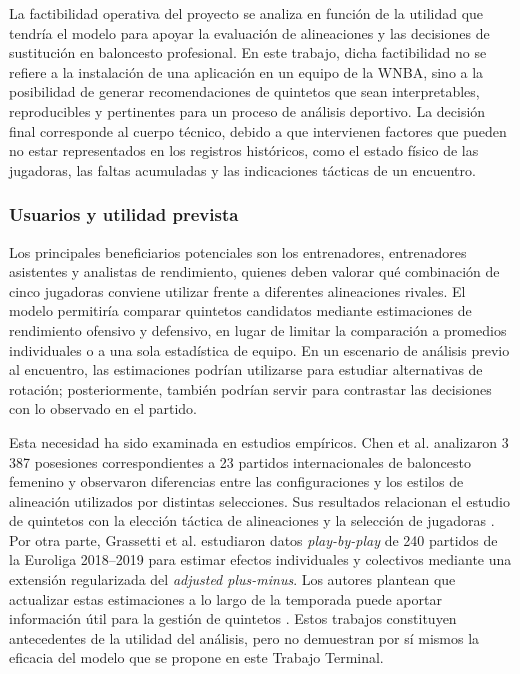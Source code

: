 La factibilidad operativa del proyecto se analiza en función de la utilidad que tendría el modelo para apoyar la evaluación de alineaciones y las decisiones de sustitución en baloncesto profesional. En este trabajo, dicha factibilidad no se refiere a la instalación de una aplicación en un equipo de la WNBA, sino a la posibilidad de generar recomendaciones de quintetos que sean interpretables, reproducibles y pertinentes para un proceso de análisis deportivo. La decisión final corresponde al cuerpo técnico, debido a que intervienen factores que pueden no estar representados en los registros históricos, como el estado físico de las jugadoras, las faltas acumuladas y las indicaciones tácticas de un encuentro.

\subsubsection*{Usuarios y utilidad prevista}

Los principales beneficiarios potenciales son los entrenadores, entrenadores asistentes y analistas de rendimiento, quienes deben valorar qué combinación de cinco jugadoras conviene utilizar frente a diferentes alineaciones rivales. El modelo permitiría comparar quintetos candidatos mediante estimaciones de rendimiento ofensivo y defensivo, en lugar de limitar la comparación a promedios individuales o a una sola estadística de equipo. En un escenario de análisis previo al encuentro, las estimaciones podrían utilizarse para estudiar alternativas de rotación; posteriormente, también podrían servir para contrastar las decisiones con lo observado en el partido.

Esta necesidad ha sido examinada en estudios empíricos. Chen et al. analizaron 3\,387 posesiones correspondientes a 23 partidos internacionales de baloncesto femenino y observaron diferencias entre las configuraciones y los estilos de alineación utilizados por distintas selecciones. Sus resultados relacionan el estudio de quintetos con la elección táctica de alineaciones y la selección de jugadoras \cite{Chen17122023}. Por otra parte, Grassetti et al. estudiaron datos \textit{play-by-play} de 240 partidos de la Euroliga 2018--2019 para estimar efectos individuales y colectivos mediante una extensión regularizada del \textit{adjusted plus-minus}. Los autores plantean que actualizar estas estimaciones a lo largo de la temporada puede aportar información útil para la gestión de quintetos \cite{grassetti2021lineupmanagement}. Estos trabajos constituyen antecedentes de la utilidad del análisis, pero no demuestran por sí mismos la eficacia del modelo que se propone en este Trabajo Terminal.

